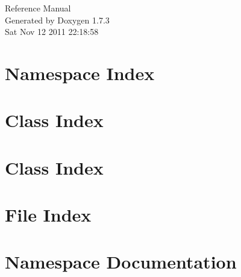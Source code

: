 \documentclass[a4paper]{book}
\begin{document}
\hypersetup{pageanchor=false}
\begin{titlepage}
\vspace*{7cm}
\begin{center}
{\Large Reference Manual}\\
\vspace*{1cm}
{\large Generated by Doxygen 1.7.3}\\
\vspace*{0.5cm}
{\small Sat Nov 12 2011 22:18:58}\\
\end{center}
\end{titlepage}
\clearemptydoublepage
{}
\tableofcontents
\clearemptydoublepage
{}
\hypersetup{pageanchor=true}
\chapter{Namespace Index}

\chapter{Class Index}

\chapter{Class Index}

\chapter{File Index}

\chapter{Namespace Documentation}


\end{document}
